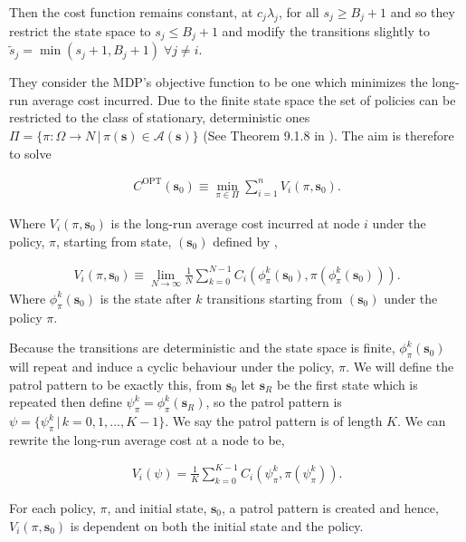 \documentclass[a4paper,10pt]{article}
\theoremstyle{definition}
\theoremstyle{definition}
\theoremstyle{remark}
\theoremstyle{definition}
\begin{document}
Then the cost function remains constant, at $c_{j} \lambda_{j}$, for all $s_{j} \geq B_{j}+1$ and so they restrict the state space to $s_{j} \leq B_{j}+1$ and modify the transitions slightly to $\widetilde{s}_{j}=\min(s_{j}+1,B_{j}+1) \; \forall j \neq i$.

They consider the MDP's objective function to be one which minimizes the long-run average cost incurred. Due to the finite state space the set of policies can be restricted to the class of stationary, deterministic ones $\Pi= \{\pi: \Omega \rightarrow N \, |\,\pi(\bm{s}) \in \mathcal{A}(\bm{s}) \}$ (See Theorem 9.1.8 in \cite{Puterman1994}). The aim is therefore to solve

\begin{align*}
C^{\text{OPT}}(\bm{s}_{0}) \equiv \min\limits_{\pi \in \Pi} \sum\limits_{i=1}^{n} V_{i}(\pi,\bm{s}_{0}).
\end{align*}

Where $V_{i}(\pi,\bm{s}_{0})$ is the long-run average cost incurred at node $i$ under the policy, $\pi$, starting from state, $(\bm{s}_{0})$ defined by ,

\begin{align*}
V_{i}(\pi,\bm{s}_{0}) \equiv \lim\limits_{N \rightarrow \infty} \frac{1}{N} \sum\limits_{k=0}^{N-1} C_{i}(\phi^{k}_{\pi}(\bm{s}_{0}),\pi(\phi^{k}_{\pi}(\bm{s}_{0}))).
\end{align*}
Where $\phi^{k}_{\pi}(\bm{s}_{0})$ is the state after $k$ transitions starting from $(\bm{s}_{0})$ under the policy $\pi$.

Because the transitions are deterministic and the state space is finite, $\phi^{k}_{\pi}(\bm{s}_{0})$ will repeat and induce a cyclic behaviour under the policy, $\pi$. We will define the patrol pattern to be exactly this, from $\bm{s}_{0}$ let $\bm{s}_{R}$ be the first state which is repeated then define $\psi^{k}_{\pi}=\phi^{k}_{\pi}(\bm{s}_{R})$, so the patrol pattern is $\psi=\{\psi^{k}_{\pi} \, | \, k=0,1,...,K-1 \}$. We say the patrol pattern is of length $K$. We can rewrite the long-run average cost at a node to be,

\begin{align}
\label{Equation:Average long run cost via patrol pattern}
V_{i}(\psi)=\frac{1}{K} \sum\limits_{k=0}^{K-1} C_{i}(\psi^{k}_{\pi},\pi(\psi^{k}_{\pi})).
\end{align}

For each policy, $\pi$, and initial state, $\bm{s}_{0}$, a patrol pattern is created and hence, $V_{i}(\pi,\bm{s}_{0})$ is dependent on both the initial state and the policy.
\end{document}
